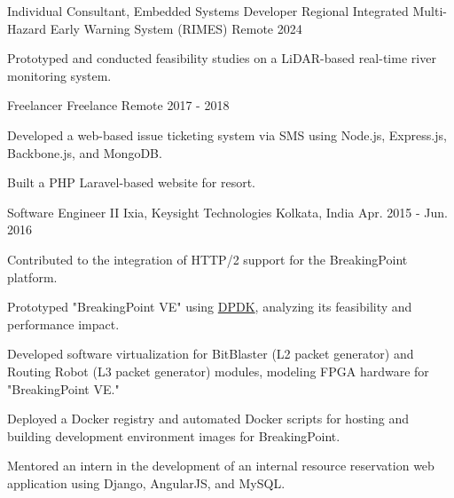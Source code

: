 
\begin{cventries}
\cventry
{Individual Consultant, Embedded Systems Developer} %
{Regional Integrated Multi-Hazard Early Warning System (RIMES)} %
{Remote} %
{2024} %
{\begin{cvitems} %
		\item {Prototyped and conducted feasibility studies on a LiDAR-based real-time river monitoring system.}
\end{cvitems}}

\cventry
{Freelancer} %
{Freelance} %
{Remote} %
{2017 - 2018} %
{\begin{cvitems} %
		\item {Developed a web-based issue ticketing system via SMS using Node.js, Express.js, Backbone.js, and MongoDB.}
		\item {Built a PHP Laravel-based website for resort.}
\end{cvitems}}

\cventry
{Software Engineer II} %
{Ixia, Keysight Technologies} %
{Kolkata, India} %
{Apr. 2015 - Jun. 2016} %
{\begin{cvitems} %
		\item {Contributed to the integration of HTTP/2 support for the BreakingPoint platform.}
		\item {Prototyped "BreakingPoint VE" using \href{https://www.dpdk.org/}{DPDK}, analyzing its feasibility and performance impact.}
		\item {Developed software virtualization for BitBlaster (L2 packet generator) and Routing Robot (L3 packet generator) modules, modeling FPGA hardware for "BreakingPoint VE."}
		\item {Deployed a Docker registry and automated Docker scripts for hosting and building development environment images for BreakingPoint.}
		\item {Mentored an intern in the development of an internal resource reservation web application using Django, AngularJS, and MySQL.}
\end{cvitems}}


\end{cventries}
